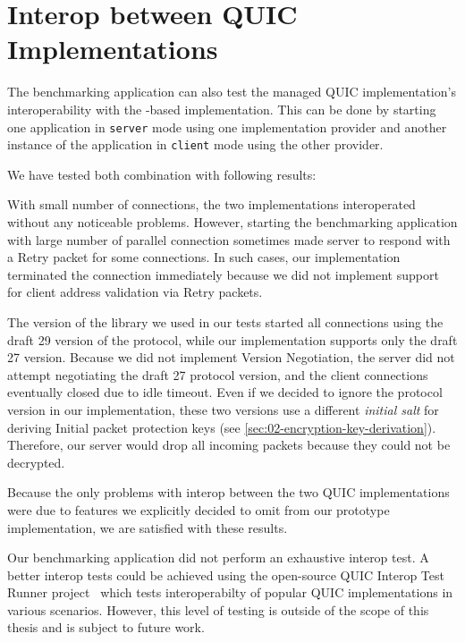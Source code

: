 \section{Interop between QUIC Implementations}

The benchmarking application can also test the managed QUIC implementation's interoperability with
the \libmsquic{}-based implementation. This can be done by starting one application in
\texttt{server} mode using one implementation provider and another instance of the application in
\texttt{client} mode using the other provider.

We have tested both combination with following results:

\begin{itemize}

   With small number of connections, the two
implementations interoperated without any noticeable problems. However, starting the benchmarking
application with large number of parallel connection sometimes made \libmsquic{} server to respond
with a Retry packet for some connections. In such cases, our implementation terminated the
connection immediately because we did not implement support for client address validation via Retry
packets.

   The version of the \libmsquic{} library we used in
our tests started all connections using the draft 29 version of the protocol, while our
implementation supports only the draft 27 version. Because we did not implement Version Negotiation,
the server did not attempt negotiating the draft 27 protocol version, and the \libmsquic{} client
connections eventually closed due to idle timeout. Even if we decided to ignore the protocol version
in our implementation, these two versions use a different \textit{initial salt} for deriving Initial
packet protection keys (see \autoref{sec:02-encryption-key-derivation}). Therefore, our server would
drop all incoming packets because they could not be decrypted.

\end{itemize}

Because the only problems with interop between the two QUIC implementations were due to features we
explicitly decided to omit from our prototype implementation, we are satisfied with these results.

Our benchmarking application did not perform an exhaustive interop test. A better interop tests
could be achieved using the open-source QUIC Interop Test Runner project~\cite{QuicInteropRunner}
which tests interoperabilty of popular QUIC implementations in various scenarios. However, this
level of testing is outside of the scope of this thesis and is subject to future work.

